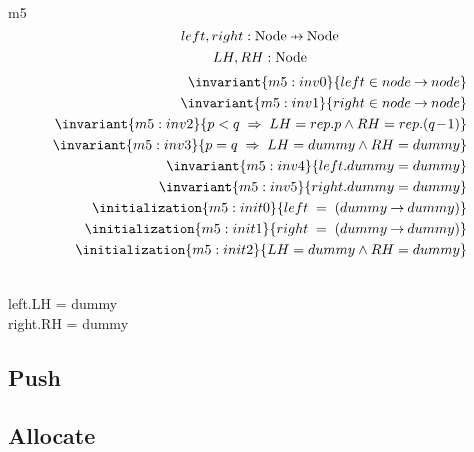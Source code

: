 \documentclass[12pt]{amsart}
\begin{document}
\begin{machine}{m5}
  \[ \variable{ left, right : \Node \pfun \Node } \]
  \[  LH, RH : \text{Node}  \]
  \begin{align}
    \invariant{m5:inv0}{ left \in node \tfun node } \\
    \invariant{m5:inv1}{ right \in node \tfun node }  \\
    \invariant{m5:inv2}
      { p < q \1\implies LH = rep.p \land RH = rep.(q\0-1) }  \\
    \invariant{m5:inv3}
      { p = q \1\implies LH = dummy \land RH = dummy }  \\
    \invariant{m5:inv4}{ left.dummy = dummy }  \\
    \invariant{m5:inv5}{ right.dummy = dummy }  \\
    \initialization{m5:init0}{ left \1= (dummy \fun dummy) } \\
    \initialization{m5:init1}{ right \1= (dummy \fun dummy) } \\
    \initialization{m5:init2}{ LH = dummy \land RH = dummy }
  \end{align}

      {  } \\
      {  } 
      { left.LH = dummy } \\
      { right.RH = dummy } \\
      
\subsection{Push}
\subsection{Allocate}
\end{machine}
\end{document}
